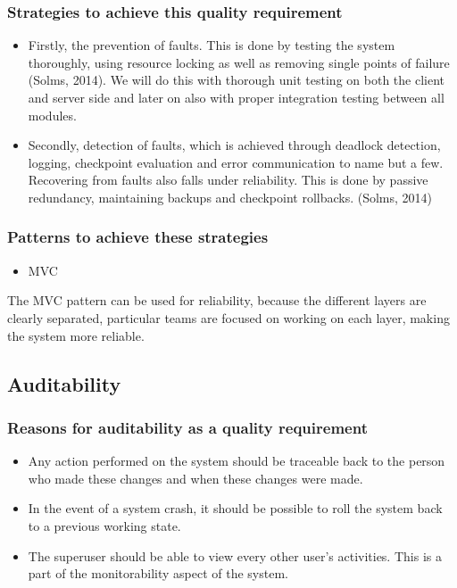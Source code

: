 \documentclass[a4paper,12pt]{article}
\begin{document}
\subsubsection{Strategies to achieve this quality requirement}
\begin{itemize}
\item Firstly, the prevention of faults. This is done by testing the system thoroughly, using resource locking as well as removing single points of failure (Solms, 2014). We will do this with thorough unit testing on both the client and server side and later on also with proper integration testing between all modules. 
 \item Secondly, detection of faults, which is achieved through deadlock detection, logging, checkpoint evaluation and error communication to name but a few. Recovering from faults also falls under reliability. This is done by passive redundancy, maintaining backups and checkpoint rollbacks. (Solms, 2014)
 \end{itemize}

 \subsubsection{Patterns to achieve these strategies}
 \begin{itemize}
 \item MVC
 \end{itemize}
 The MVC pattern can  be used for reliability, because the different layers are clearly separated, particular teams are focused on working on each layer, making the system more reliable. 

 \subsection{Auditability}

 \subsubsection{Reasons for auditability as a quality requirement}
 \begin{itemize}
 \item Any action performed on the system should be traceable back to the person who made these changes and when these changes were made.
 \item In the event of a system crash, it should be possible to roll the system back to a previous working state.
 \item The superuser should be able to view every other user's activities. This is a part of the monitorability aspect of the system.
 \end{itemize}
\end{document}
